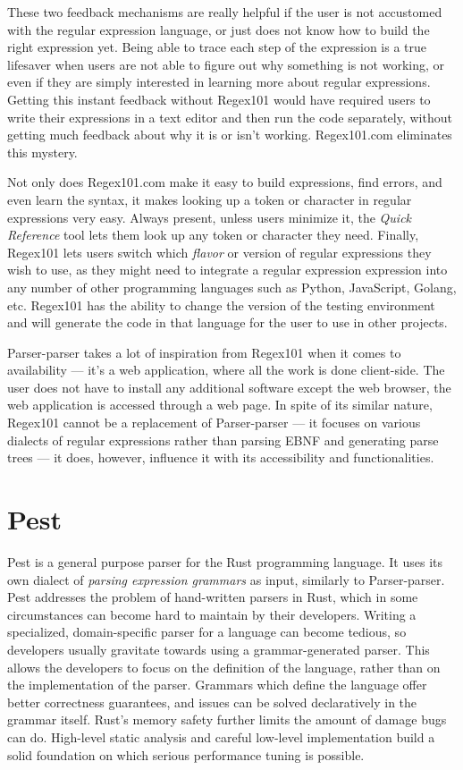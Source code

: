 \documentclass[english,bachelors,forcepolishlogotype]{wizthesis}
\newcommand{\paraphrase}[1]{#1}
\newcommand{\thisproject}{Parser-parser}
\begin{document}
{These two feedback mechanisms are really helpful if the user is not accustomed
with the regular expression language, or just does not know how to build the
right expression yet. Being able to trace each step of the expression is a true
lifesaver when users are not able to figure out why something is not working, or
even if they are simply interested in learning more about regular expressions.
Getting this instant feedback without Regex101 would have required users to
write their expressions in a text editor and then run the code separately,
without getting much feedback about why it is or isn't working. Regex101.com
eliminates this mystery.

Not only does Regex101.com make it easy to build expressions, find errors, and
even learn the syntax, it makes looking up a token or character in regular
expressions very easy. Always present, unless users minimize it, the \emph{Quick
Reference} tool lets them look up any token or character they need. Finally,
Regex101 lets users switch which \emph{flavor} or version of regular expressions
they wish to use, as they might need to integrate a regular expression
expression into any number of other programming languages such as Python,
JavaScript, Golang, etc. Regex101 has the ability to change the version of the
testing environment and will generate the code in that language for the user to
use in other projects.}

\thisproject{} takes a lot of inspiration from Regex101 when it comes to
availability --- it's a web application, where all the work is done client-side.
The user does not have to install any additional software except the web
browser, the web application is accessed through a web page. In spite of its
similar nature, Regex101 cannot be a replacement of \thisproject{} --- it
focuses on various dialects of regular expressions rather than parsing EBNF and
generating parse trees --- it does, however, influence it with its accessibility
and functionalities.

\section*{Pest}

Pest \cite{pest} is a general purpose parser for the Rust \cite{rust}
programming language. It uses its own dialect of \emph{parsing expression
grammars} as input, similarly to \thisproject{}. Pest addresses the problem of
hand-written parsers in Rust, which in some circumstances can become hard to
maintain by their developers. Writing a specialized, domain-specific parser for
a language can become tedious, so developers usually gravitate towards using a
grammar-generated parser. This allows the developers to focus on the definition
of the language, rather than on the implementation of the parser.
\paraphrase{Grammars which define the language offer better correctness
guarantees, and issues can be solved declaratively in the grammar itself. Rust's
memory safety further limits the amount of damage bugs can do. High-level static
analysis and careful low-level implementation build a solid foundation on which
serious performance tuning is possible.}
\end{document}

